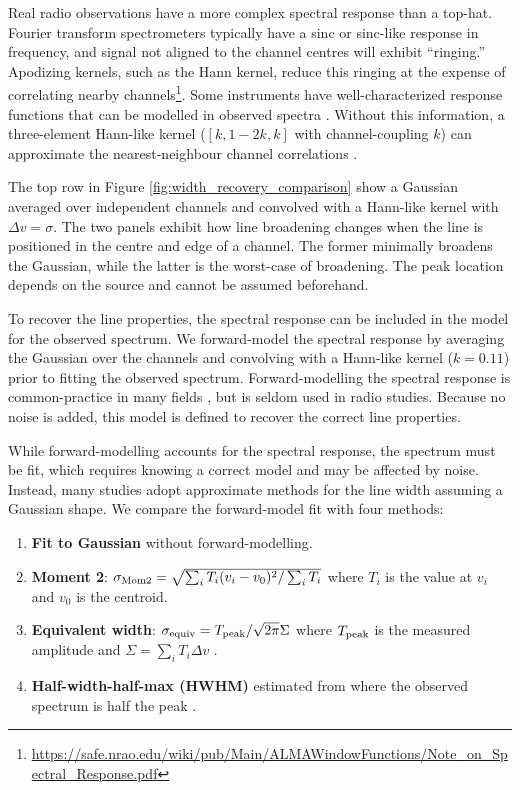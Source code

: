 \documentclass{rnaastex}
\begin{document}
Real radio observations have a more complex spectral response than a top-hat.  Fourier transform spectrometers typically have a sinc or sinc-like response in frequency, and signal not aligned to the channel centres will exhibit ``ringing.''  Apodizing kernels, such as the Hann kernel, reduce this ringing at the expense of correlating nearby channels\footnote{\url{https://safe.nrao.edu/wiki/pub/Main/ALMAWindowFunctions/Note_on_Spectral_Response.pdf}}.  Some instruments have well-characterized response functions that can be modelled in observed spectra \citep{rosolowsky2008}.  Without this information, a three-element Hann-like kernel ($[k, 1 - 2k, k]$ with channel-coupling $k$) can approximate the nearest-neighbour channel correlations \citep{leroy2016}.

The top row in Figure \ref{fig:width_recovery_comparison} show a Gaussian averaged over independent channels and convolved with a Hann-like kernel with $\Delta v=\sigma$.  The two panels exhibit how line broadening changes when the line is positioned in the centre and edge of a channel. The former minimally broadens the Gaussian, while the latter is the worst-case of broadening.  The peak location depends on the source and cannot be assumed beforehand.

To recover the line properties, the spectral response can be included in the model for the observed spectrum.  We forward-model the spectral response by averaging the Gaussian over the channels and convolving with a Hann-like kernel ($k=0.11$) prior to fitting the observed spectrum.  Forward-modelling the spectral response is common-practice in many fields \citep[e.g.,][]{martin2015}, but is seldom used in radio studies.  Because no noise is added, this model is defined to recover the correct line properties.

While forward-modelling accounts for the spectral response, the spectrum must be fit, which requires knowing a correct model and may be affected by noise.  Instead, many studies adopt approximate methods for the line width assuming a Gaussian shape. We compare the forward-model fit with four methods:
\begin{enumerate}
    \item {\bf Fit to Gaussian} without forward-modelling.
    \item {\bf Moment 2}: $\sigma_{\rm Mom2}=\sqrt{\sum_i T_i (v_i - v_0)^2 / \sum_i T_i}$ where $T_i$ is the value at $v_i$ and $v_0$ is the centroid.
    \item {\bf Equivalent width}: $\sigma_{\rm equiv} = T_{\rm peak} / \sqrt{2\pi} \Sigma$ where $T_{\rm peak}$ is the measured amplitude and $\Sigma= \sum_i T_i \Delta v$ \citep{heyer2001,leroy2016,sun2018}.
    \item {\bf Half-width-half-max (HWHM)} estimated from where the observed spectrum is half the peak \citep{stilp2013a,stilp2013b,koch2018}.
\end{enumerate}
\end{document}
